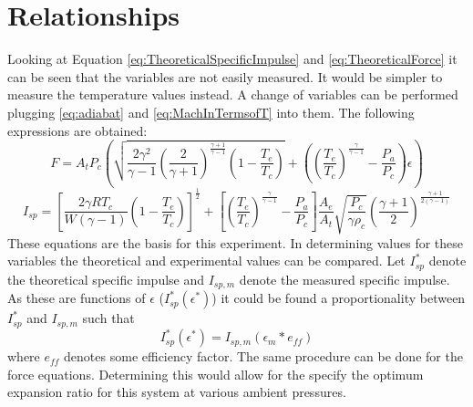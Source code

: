 \section{Relationships}\label{sec:Relationships}
Looking at Equation \ref{eq:TheoreticalSpecificImpulse} and \ref{eq:TheoreticalForce} it can be seen that the variables are not easily measured. It would be simpler to measure the temperature values instead. A change of variables can be performed plugging \ref{eq:adiabat} and \ref{eq:MachInTermsofT} into them. The following expressions are obtained:
\begin{equation}\label{eq:RelevantNozzleForce}
F = A_t P_c \left(\sqrt{\frac{2\gamma^2}{\gamma-1}\left(\frac{2}{\gamma+1}\right)^{\frac{\gamma+1}{\gamma-1}}\left(1-\frac{T_e}{T_c}\right)}+\left(\left(\frac{T_e}{T_c}\right)^{\frac{\gamma}{\gamma-1}}-\frac{P_a}{P_c}\right)\epsilon\right)
\end{equation}
\begin{equation}\label{eq:RelevantIsp}
I_{sp}=\left[\frac{2\gamma R T_c}{W(\gamma-1)}\left(1-\frac{T_e}{T_c}\right)\right]^{\frac{1}{2}}+\left[\left(\frac{T_e}{T_c}\right)^{\frac{\gamma}{\gamma-1}}-\frac{P_a}{P_c}\right]\frac{A_e}{A_t}\sqrt{\frac{P_c}{\gamma\rho_c}}\left(\frac{\gamma+1}{2}\right)^{\frac{\gamma+1}{2(\gamma-1)}}
\end{equation}
These equations are the basis for this experiment. In determining values for these variables the theoretical and experimental values can be compared. Let $I_{sp}^*$ denote the theoretical specific impulse and $I_{sp,m}$ denote the measured specific impulse. As these are functions of $\epsilon$ ($I_{sp}^*(\epsilon^*)$) it could be found a proportionality between $I_{sp}^*$ and $I_{sp,m}$ such that
\begin{equation}
I_{sp}^*(\epsilon^*)=I_{sp,m}(\epsilon_m*e_{ff})
\end{equation}%
%
%
%
%
%
where $e_{ff}$ denotes some efficiency factor. The same procedure can be done for the force equations. Determining this would allow for the specify the optimum expansion ratio for this system at various ambient pressures.